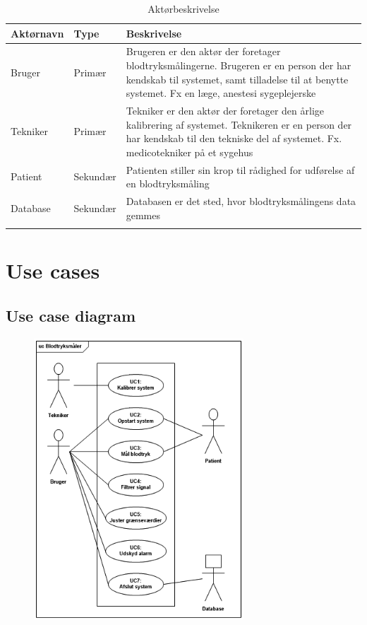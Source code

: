 \begin{longtabu}to 
	{\large \textbf{Aktørnavn}} & {\large \textbf{Type}} & {\large \textbf{Beskrivelse}}\\ \toprule
	Bruger & Primær & Brugeren er den aktør der foretager blodtryksmålingerne. Brugeren er en person der har kendskab til systemet, samt tilladelse til at benytte systemet. Fx en læge, anestesi sygeplejerske \\
	Tekniker & Primær & Tekniker er den aktør der foretager den årlige kalibrering af systemet. Teknikeren er en person der har kendskab til den tekniske del af systemet. Fx. medicotekniker på et sygehus\\
	Patient & Sekundær & Patienten stiller sin krop til rådighed for udførelse af en blodtryksmåling\\
	Database & Sekundær & Databasen er det sted, hvor blodtryksmålingens data gemmes \\ \bottomrule
\caption{Aktørbeskrivelse}
\label{Aktoerbeskrivelse}
\end{longtabu}

\section{Use cases}
\subsection{Use case diagram}
\begin{figure}[H]
	\centering
	\includegraphics[width=0.7\textwidth]{Figurer/UCdiagram}
\end{figure}

